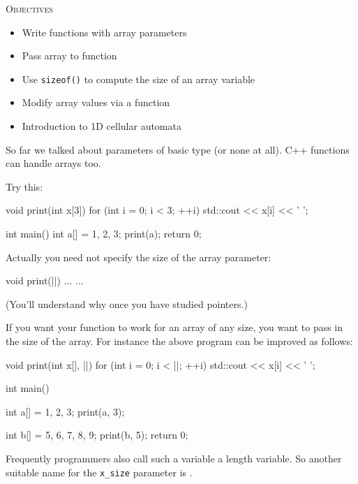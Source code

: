 \newpage{}

\textsc{Objectives}

\begin{itemize}

\item
  Write functions with array parameters
\item
  Pass array to function
\item
  Use \texttt{sizeof()} to compute the size of an array variable
\item
  Modify array values via a function
\item
  Introduction to 1D cellular automata
\end{itemize}

\newpage{}

So far we talked about parameters of basic type (or none at all). C++
functions can handle arrays too.

Try this:

\begin{consolethree}[escapeinside=||]
void print(int x[3])
{
    for (int i = 0; i < 3; ++i)
    {
        std::cout << x[i] << ' ';
    }
}

int main()
{
    int a[] = {1, 2, 3};
    print(a);
    return 0;
}
\end{consolethree}

Actually you need not specify the size of the array parameter:

\begin{consolethree}[escapeinside=||]
void print(||)
{
    ...
}
...
\end{consolethree}

(You'll understand why once you have studied pointers.)

If you want your function to work for an array of any size, you want to
pass in the size of the array. For instance the above program can be
improved as follows:

\begin{consolethree}[escapeinside=||]
void print(int x[], ||)
{
    for (int i = 0; i < ||; ++i)
    {
        std::cout << x[i] << ' ';
    }
}

int main()
{
    int a[] = {1, 2, 3};
    print(a, 3);

    int b[] = {5, 6, 7, 8, 9};
    print(b, 5);
    return 0;
}
\end{consolethree}

Frequently programmers also call such a variable a length variable. So another suitable name for the \texttt{x\_size} parameter is \texttt{}.

